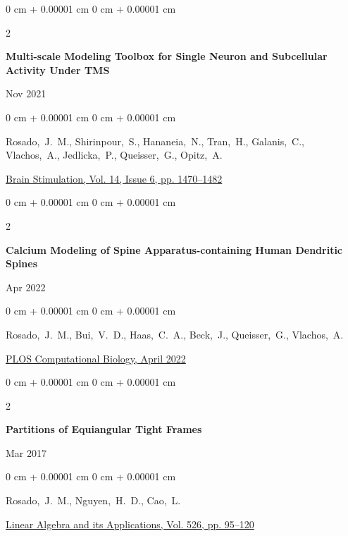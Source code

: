 \documentclass[10pt, letterpaper]{article}
\newenvironment{onecolentry}{
    \begin{adjustwidth}{
        0 cm + 0.00001 cm
    }{
        0 cm + 0.00001 cm
    }
}{
    \end{adjustwidth}
} %
\newenvironment{twocolentry}[2][]{
    \onecolentry
    \def\secondColumn{#2}
    \setcolumnwidth{\fill, 4.5 cm}
    \begin{paracol}{2}
}{
    \switchcolumn \raggedleft \secondColumn
    \end{paracol}
    \endonecolentry
} %
\begin{document}
\vspace{0.3 cm}

\begin{samepage}
    \begin{twocolentry}{
        Nov 2021
    }
        \textbf{Multi-scale Modeling Toolbox for Single Neuron and Subcellular Activity Under TMS}
    \end{twocolentry}

    \vspace{0.10 cm}

    \begin{onecolentry}
        \mbox{Rosado, J. M.}, \mbox{Shirinpour, S.}, \mbox{Hananeia, N.}, \mbox{Tran, H.}, \mbox{Galanis, C.}, \mbox{Vlachos, A.}, \mbox{Jedlicka, P.}, \mbox{Queisser, G.}, \mbox{Opitz, A.}

        \vspace{0.10 cm}

        \href{https://doi.org/10.1016/j.brs.2021.09.024}{Brain Stimulation, Vol. 14, Issue 6, pp. 1470–1482}
    \end{onecolentry}
\end{samepage}

\vspace{0.3 cm}

\begin{samepage}
    \begin{twocolentry}{
        Apr 2022
    }
        \textbf{Calcium Modeling of Spine Apparatus-containing Human Dendritic Spines}
    \end{twocolentry}

    \vspace{0.10 cm}

    \begin{onecolentry}
        \mbox{Rosado, J. M.}, \mbox{Bui, V. D.}, \mbox{Haas, C. A.}, \mbox{Beck, J.}, \mbox{Queisser, G.}, \mbox{Vlachos, A.}

        \vspace{0.10 cm}

        \href{https://doi.org/10.1371/journal.pcbi.1010014}{PLOS Computational Biology, April 2022}
    \end{onecolentry}
\end{samepage}

\vspace{0.3 cm}

\begin{samepage}
    \begin{twocolentry}{
        Mar 2017
    }
        \textbf{Partitions of Equiangular Tight Frames}
    \end{twocolentry}

    \vspace{0.10 cm}

    \begin{onecolentry}
        \mbox{Rosado, J. M.}, \mbox{Nguyen, H. D.}, \mbox{Cao, L.}

        \vspace{0.10 cm}

        \href{https://doi.org/10.1016/j.laa.2016.12.016}{Linear Algebra and its Applications, Vol. 526, pp. 95–120}
    \end{onecolentry}
\end{samepage}
\end{document}
